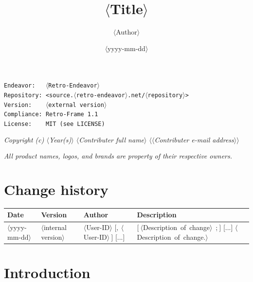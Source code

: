 \documentclass{scrartcl}
\title{$\langle$Title$\rangle$}
\author{$\langle$Author$\rangle$}
\date{$\langle$yyyy-mm-dd$\rangle$}
\begin{document}
\begin{titlepage}
\maketitle
\vspace{300pt}

\noindent \texttt{Endeavor:~~~$\langle$Retro-Endeavor$\rangle$}\\
\noindent \texttt{Repository:~<source.$\langle$retro-endeavor$\rangle$.net/$\langle$repository$\rangle$>}\\
\noindent \texttt{Version:~~~~$\langle$external version$\rangle$}\\
\noindent \texttt{Compliance:~Retro-Frame 1.1}\\
\noindent \texttt{License:~~~~MIT (see LICENSE)}

\vspace{10pt}
\noindent \textit{Copyright (c) $\langle$Year(s)$\rangle$ $\langle$Contributer full name$\rangle$ $\langle\langle$Contributer e-mail address$\rangle\rangle$}

\vspace{10pt}
\noindent \textit{All product names, logos, and brands are property of their respective owners.}

\newpage

\section*{Change history}

\vspace{10pt}
\begin{tabularx}{\textwidth}{|p{52pt}|p{42pt}|p{65pt}|X|}
\hline
\textbf{Date} & \textbf{Version} & \textbf{Author} & \textbf{Description}\\
\hline
$\langle$yyyy-mm-dd$\rangle$ & $\langle$internal version$\rangle$ & $\langle$User-ID$\rangle$ $[,~\langle$User-ID$\rangle~]$ [...] & $[~\langle$Description~of~change$\rangle$~;$~]$ [...] $\langle$Description~of~change.$\rangle$\\
\hline
\end{tabularx}

\end{titlepage}

\newpage

\tableofcontents

\newpage

\section{Introduction}
\end{document}
